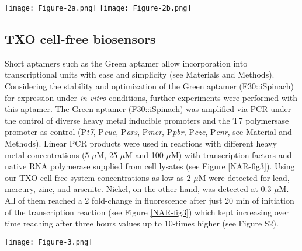 \begin{figure*}[ht]
\begin{center}
\texttt{[image: Figure-2a.png]}
\texttt{[image: Figure-2b.png]}
\end{center}
\caption{Fluorescent RNA aptamers expression. \textbf{(a)} Aptamers showing different colours under a blue light/red filter system after plate reader fluorescent measurement (16.5 h) and being observed by naked eye without the need for further equipment. A longer exposed image can be found in Supplementary Figure S1.
\textbf{(b)} Expression of diverse RNA aptamers over time detected at 480/520 nm. Coloured shades represent the variability (MAD) of three independent tests. }
\label{NAR-fig2}
\end{figure*}

\subsection*{TXO cell-free biosensors}
Short aptamers such as the Green aptamer allow incorporation into transcriptional units with ease and simplicity (see Materials and Methods). Considering the stability and optimization of the Green aptamer (F30::iSpinach) for expression under \textit{in vitro} conditions, further experiments were performed with this aptamer. The Green aptamer (F30::iSpinach) was amplified via PCR under the control of diverse heavy metal inducible promoters and the T7 polymersase promoter as control (P\textit{t7}, P\textit{cue}, P\textit{ars}, P\textit{mer}, P\textit{pbr}, P\textit{czc}, P\textit{cnr}, see Material and Methods). Linear PCR products were used in reactions with different heavy metal concentrations (5 $\mu$M, 25 $\mu$M and 100 $\mu$M) with transcription factors and native RNA polymerase supplied from cell lysates (see Figure \ref{NAR-fig3}). Using our TXO cell free system concentrations as low as 2 $\mu$M were detected for lead, mercury, zinc, and arsenite. Nickel, on the other hand, was detected at 0.3 $\mu$M.  All of them reached a 2 fold-change in fluorescence after just 20 min of initiation of the transcription reaction (see Figure \ref{NAR-fig3}) which kept increasing over time reaching after three hours values up to 10-times higher (see Figure S2).

\begin{figure*}[t]
\begin{center}
\hspace*{0cm}
\texttt{[image: Figure-3.png]}
\end{center}
\caption{Heavy metal detection by TXO Cell-free biosensors. Detection of Pb$^{2+}$, Hg$^{2+}$, Zn$^{2+}$, Ni$^{2+}$, Cu$^{2+}$ and As$^{3+}$
using the TXO reaction Cell-free system and the Green RNA aptamer cloned with each specified promoter (P\textit{pbr}, P\textit{mer}, P\textit{cnr}, P\textit{czc}, P\textit{cop}, and P\textit{ars}). Constructs were induced using increasing concentrations of the specified heavy-metal. Excitation/Emission of 480/520 nm. Data points at 20 minutes; the time course can be found in Supplementary Figure S2. Error bars represent the variability (MAD) of three independent tests.}
\label{NAR-fig3}
\end{figure*}


